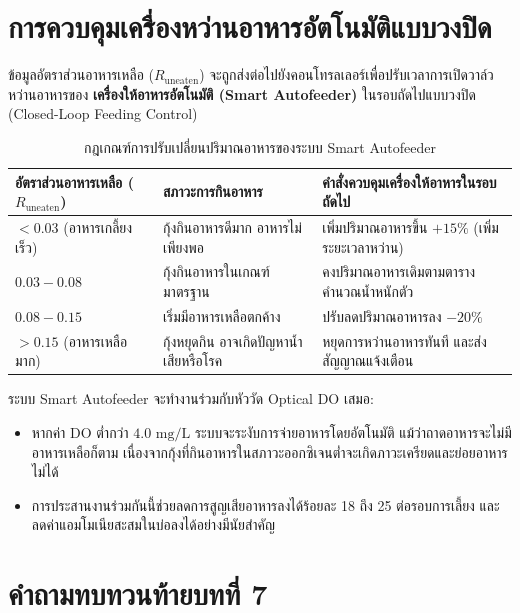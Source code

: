 \section{การควบคุมเครื่องหว่านอาหารอัตโนมัติแบบวงปิด}

ข้อมูลอัตราส่วนอาหารเหลือ ($R_{\text{uneaten}}$) จะถูกส่งต่อไปยังคอนโทรลเลอร์เพื่อปรับเวลาการเปิดวาล์วหว่านอาหารของ \textbf{เครื่องให้อาหารอัตโนมัติ (Smart Autofeeder)} ในรอบถัดไปแบบวงปิด (Closed-Loop Feeding Control)

\begin{table}[H]
\centering
\caption{กฎเกณฑ์การปรับเปลี่ยนปริมาณอาหารของระบบ Smart Autofeeder}
\label{tab:autofeeder_rules}
\begin{tabularx}{\textwidth}{p{3.2cm}p{4.5cm}Y}
    \toprule
    \textbf{อัตราส่วนอาหารเหลือ ($R_{\text{uneaten}}$)} & \textbf{สภาวะการกินอาหาร} & \textbf{คำสั่งควบคุมเครื่องให้อาหารในรอบถัดไป} \\
    \midrule
    $< 0.03$ (อาหารเกลี้ยงเร็ว) & กุ้งกินอาหารดีมาก อาหารไม่เพียงพอ & เพิ่มปริมาณอาหารขึ้น $+15\%$ (เพิ่มระยะเวลาหว่าน) \\
    $0.03 - 0.08$ & กุ้งกินอาหารในเกณฑ์มาตรฐาน & คงปริมาณอาหารเดิมตามตารางคำนวณน้ำหนักตัว \\
    $0.08 - 0.15$ & เริ่มมีอาหารเหลือตกค้าง & ปรับลดปริมาณอาหารลง $-20\%$ \\
    $> 0.15$ (อาหารเหลือมาก) & กุ้งหยุดกิน อาจเกิดปัญหาน้ำเสียหรือโรค & หยุดการหว่านอาหารทันที และส่งสัญญาณแจ้งเตือน \\
    \bottomrule
\end{tabularx}
\end{table}

\begin{theorybox}
ระบบ Smart Autofeeder จะทำงานร่วมกับหัววัด Optical DO เสมอ:
\begin{itemize}[leftmargin=1.5em]
    \item หากค่า DO ต่ำกว่า $4.0\text{ mg/L}$ ระบบจะระงับการจ่ายอาหารโดยอัตโนมัติ แม้ว่าถาดอาหารจะไม่มีอาหารเหลือก็ตาม เนื่องจากกุ้งที่กินอาหารในสภาวะออกซิเจนต่ำจะเกิดภาวะเครียดและย่อยอาหารไม่ได้
    \item การประสานงานร่วมกันนี้ช่วยลดการสูญเสียอาหารลงได้ร้อยละ 18 ถึง 25 ต่อรอบการเลี้ยง และลดค่าแอมโมเนียสะสมในบ่อลงได้อย่างมีนัยสำคัญ
\end{itemize}
\end{theorybox}

\section*{คำถามทบทวนท้ายบทที่ 7}

